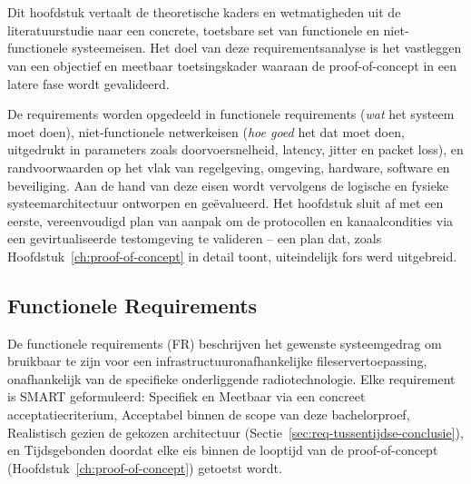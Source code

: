 
\chapter{}%
\label{ch:requirementsanalyse}

Dit hoofdstuk vertaalt de theoretische kaders en wetmatigheden uit de literatuurstudie naar een concrete, toetsbare set van functionele en niet-functionele systeemeisen. Het doel van deze requirementsanalyse is het vastleggen van een objectief en meetbaar toetsingskader waaraan de proof-of-concept in een latere fase wordt gevalideerd.

De requirements worden opgedeeld in functionele requirements (\emph{wat} het systeem moet doen), niet-functionele netwerkeisen (\emph{hoe goed} het dat moet doen, uitgedrukt in parameters zoals doorvoersnelheid, latency, jitter en packet loss), en randvoorwaarden op het vlak van regelgeving, omgeving, hardware, software en beveiliging. Aan de hand van deze eisen wordt vervolgens de logische en fysieke systeemarchitectuur ontworpen en geëvalueerd. Het hoofdstuk sluit af met een eerste, vereenvoudigd plan van aanpak om de protocollen en kanaalcondities via een gevirtualiseerde testomgeving te valideren -- een plan dat, zoals Hoofdstuk~\ref{ch:proof-of-concept} in detail toont, uiteindelijk fors werd uitgebreid.

\section{Functionele Requirements}
\label{sec:functionele-requirements}

De functionele requirements (FR) beschrijven het gewenste systeemgedrag om bruikbaar te
zijn voor een infrastructuuronafhankelijke fileservertoepassing, onafhankelijk van de
specifieke onderliggende radiotechnologie. Elke requirement is SMART geformuleerd:
Specifiek en Meetbaar via een concreet acceptatiecriterium, Acceptabel binnen de scope
van deze bachelorproef, Realistisch gezien de gekozen architectuur
(Sectie~\ref{sec:req-tussentijdse-conclusie}), en Tijdsgebonden doordat elke eis binnen
de looptijd van de proof-of-concept (Hoofdstuk~\ref{ch:proof-of-concept}) getoetst wordt.

